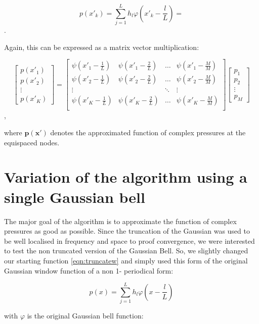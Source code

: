 \documentclass[11pt]{report} %
\begin{document}
\begin{equation}
 p(x'_{k})=\sum\limits_{j=1}^L h_{l}\varphi(x'_{k}-\frac{l}{L})=
\end{equation}. 

Again, this can be expressed as a matrix vector multiplication: 

\[
\begin{bmatrix}
	p(x'_1) \\
	p(x'_2) \\
	\vdots\\
	p(x'_K)
\end{bmatrix} = 
\begin{bmatrix}
    \psi(x'_{1}-\frac{1}{L})& \psi(x'_{1}-\frac{2}{L})& \dots & \psi(x'_{1}-\frac{M}{M}) \\
    \psi(x'_{2}-\frac{1}{L})& \psi(x'_{2}-\frac{2}{L})& \dots & \psi(x'_{2}-\frac{M}{M}) \\
    \vdots &  &\ddots & \vdots \\
    \psi(x'_{K}-\frac{1}{L})& \psi(x'_{K}-\frac{2}{L})& \dots & \psi(x'_{K}-\frac{M}{M}) \\   
\end{bmatrix}
\begin{bmatrix}
    p_1 \\
    p_2 \\
    \vdots \\
    p_{M}
\end{bmatrix}
\],

where $\bm{p(x')}$ denotes the approximated function of complex pressures at the equispaced nodes. 

\section{Variation of the algorithm using a single Gaussian bell}
The major goal of the algorithm is to approximate the function of complex pressures as good as possible.
Since the truncation of the Gaussian was used to be well localised in frequency and space to proof convergence, we were interested to test the non truncated version of the Gaussian Bell.
So, we slightly changed our starting function \eqref{eqn:truncatew} and simply used this form of the original Gaussian window function of a non 1- periodical form:
  
\begin{equation}
 p(x)=\sum\limits_{j=1}^L h_{l}\varphi(x-\frac{l}{L})
\end{equation}

with $\varphi$ is the original Gaussian bell function: 
\end{document}
